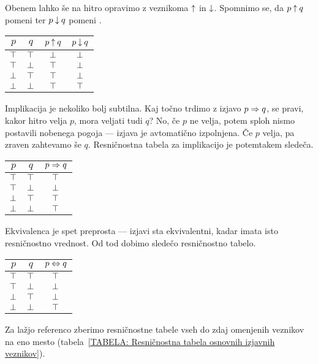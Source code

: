 		Obenem lahko še na hitro opravimo z veznikoma $\mathbin{\uparrow}$ in $\mathbin{\downarrow}$. Spomnimo se, da $p \mathbin{\uparrow} q$ pomeni  ter $p \mathbin{\downarrow} q$ pomeni .
		\begin{center}
			\begin{tabular}{cc|cc}
				$p$ & $q$ & $p \mathbin{\uparrow} q$ & $p \mathbin{\downarrow} q$ \\
				\hline
				$\top$ & $\top$ & $\bot$ & $\bot$ \\
				$\top$ & $\bot$ & $\top$ & $\bot$ \\
				$\bot$ & $\top$ & $\top$ & $\bot$ \\
				$\bot$ & $\bot$ & $\top$ & $\top$
			\end{tabular}
		\end{center}
		
		Implikacija je nekoliko bolj subtilna. Kaj točno trdimo z izjavo $p \Rightarrow q$, se pravi, kakor hitro velja $p$, mora veljati tudi $q$? No, če $p$ ne velja, potem sploh nismo postavili nobenega pogoja --- izjava je avtomatično izpolnjena. Če $p$ velja, pa zraven zahtevamo še $q$. Resničnostna tabela za implikacijo je potemtakem sledeča.
		\begin{center}
			\begin{tabular}{cc|c}
				$p$ & $q$ & $p \Rightarrow q$ \\
				\hline
				$\top$ & $\top$ & $\top$ \\
				$\top$ & $\bot$ & $\bot$ \\
				$\bot$ & $\top$ & $\top$ \\
				$\bot$ & $\bot$ & $\top$
			\end{tabular}
		\end{center}
		
		Ekvivalenca je spet preprosta --- izjavi sta ekvivalentni, kadar imata isto resničnostno vrednost. Od tod dobimo sledečo resničnostno tabelo.
		\begin{center}
			\begin{tabular}{cc|c}
				$p$ & $q$ & $p \Leftrightarrow q$ \\
				\hline
				$\top$ & $\top$ & $\top$ \\
				$\top$ & $\bot$ & $\bot$ \\
				$\bot$ & $\top$ & $\bot$ \\
				$\bot$ & $\bot$ & $\top$
			\end{tabular}
		\end{center}
		
		Za lažjo referenco zberimo resničnostne tabele vseh do zdaj omenjenih veznikov na eno mesto (tabela~\ref{TABELA: Resničnostna tabela osnovnih izjavnih veznikov}).
		
